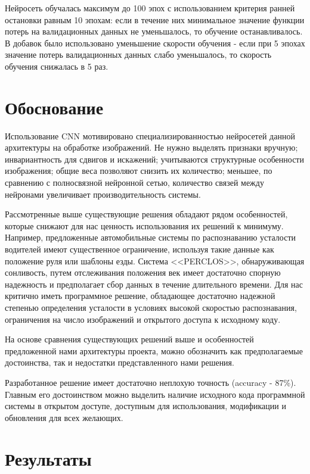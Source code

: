 \documentclass[12pt, letterpaper]{article}
\begin{document}
    Нейросеть обучалась максимум до 100 эпох с использованием критерия ранней остановки равным 10 эпохам: если в течение них минимальное значение функции потерь на валидационных данных не уменьшалось, то обучение останавливалось. В добавок было использовано уменьшение скорости обучения - если при 5 эпохах значение потерь валидационных данных слабо уменьшалось, то скорость обучения снижалась в 5 раз.
    
\section{Обоснование}\label{sec:justification}

    Использование CNN мотивировано специализированностью нейросетей данной архитектуры на обработке изображений. Не нужно выделять признаки вручную; инвариантность для сдвигов и искажений; учитываются структурные особенности изображения; общие веса позволяют снизить их количество; меньшее, по сравнению с полносвязной нейронной сетью, количество связей между нейронами увеличивает производительность системы.\cite{bengio_convolutional_1997}
    
    Рассмотренные выше существующие решения обладают рядом особенностей, которые снижают для нас ценность использования их решений к минимуму. Например, предложенные автомобильные системы по распознаванию усталости водителей имеют существенное ограничение, используя такие данные как положение руля или шаблоны езды. Система <<PERCLOS>>, обнаруживающая сонливость, путем отслеживания положения век имеет достаточно спорную надежность и предполагает сбор данных в течение длительного времени. Для нас критично иметь программное решение, обладающее достаточно надежной степенью определения усталости в условиях высокой скоростью распознавания, ограничения на число изображений и открытого доступа к исходному коду.
    
    На основе сравнения существующих решений выше и особенностей предложенной нами архитектуры проекта, можно обозначить как предполагаемые достоинства, так и недостатки представленного нами решения. 

    Разработанное решение имеет достаточно неплохую точность (accuracy - 87\%). Главным его достоинством можно выделить наличие исходного кода программной системы в открытом доступе, доступным для использования, модификации и обновления для всех желающих.
    
\section{Результаты}\label{sec:validation}
\end{document}
